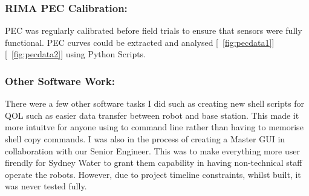 \newpage
\subsubsection{RIMA PEC Calibration: }
PEC was regularly calibrated before field trials to ensure that sensors were fully functional. PEC curves could be extracted and analysed [~\ref{fig:pecdata1}] [~\ref{fig:pecdata2}] using Python Scripts. 


\newpage
\subsubsection{Other Software Work:}

There were a few other software tasks I did such as creating new shell scripts for QOL such as easier data transfer between robot and base station. This made it more intuitve for anyone using to command line rather than having to memorise
shell copy commands. I was also in the process of creating a Master GUI in collaboration with our Senior Engineer. This was to make everything more user firendly for Sydney Water to grant them capability in having non-technical
staff operate the robots. However, due to project timeline constraints, whilst built, it was never tested fully.
